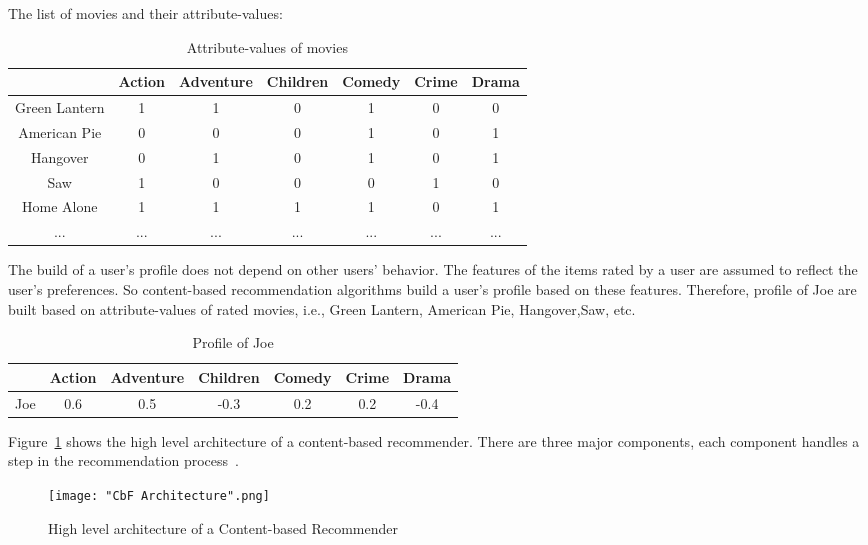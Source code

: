 \documentclass[oneside,13pt]{extreport}
\begin{document}
The list of movies and their attribute-values:
\begin{table}[h!]
    \small\centering
    \begin{tabular}{|c|c|c|c|c|c|c|}
        \hline
         & Action & Adventure & Children & Comedy & Crime & Drama   \\
        \hline
        Green Lantern & 1 & 1 & 0 & 1 & 0 & 0 \\
        \hline
        American Pie & 0 & 0 & 0 & 1 & 0 & 1 \\
        \hline
        Hangover & 0 & 1 & 0 & 1 & 0 & 1 \\
        \hline
        Saw & 1 & 0 & 0 & 0 & 1 & 0 \\
        \hline
        Home Alone & 1 & 1 & 1 & 1 & 0 & 1 \\
        \hline
        ... & ... & ... & ... & ... & ... & ... \\
        \hline
    \end{tabular}
    \caption*{Attribute-values of movies}
\end{table}

The build of a user’s profile does not depend on other users’ behavior. The features of the items rated by a user are assumed to reflect the user's preferences. So content-based recommendation algorithms build a user's profile based on these features. Therefore, profile of Joe are built based on attribute-values of rated movies, i.e., Green Lantern, American Pie, Hangover,Saw, etc.

\begin{table}[h!]
    \small\centering
    \begin{tabular}{|c|c|c|c|c|c|c|}
        \hline
         & Action & Adventure & Children & Comedy & Crime & Drama   \\
        \hline
       	Joe & 0.6 & 0.5 & -0.3 & 0.2 & 0.2 & -0.4 \\
        \hline
    \end{tabular}
    \caption*{Profile of Joe}
\end{table}


Figure~\ref{fig:CbF Architecture} shows the high level architecture of a content-based recommender. There are three major components, each component handles a step in the recommendation process~\cite{Lops11}.
\clearpage
\begin{figure}[h!]
    \centering
    \texttt{[image: "CbF Architecture".png]} 
    \caption{High level architecture of a Content-based Recommender~\cite{Lops11}}
    \!\!\!\!
    \label{fig:CbF Architecture}
\end{figure}
\end{document}
